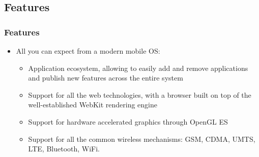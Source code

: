 \subsection{Features}
\begin{frame}
  \frametitle{Features}
  \begin{itemize}
  \item All you can expect from a modern mobile OS:
    \begin{itemize}
    \item Application ecosystem, allowing to easily add and remove
      applications and publish new features across the entire system
    \item Support for all the web technologies, with a browser built
      on top of the well-established WebKit rendering engine
    \item Support for hardware accelerated graphics through OpenGL ES
    \item Support for all the common wireless mechanisms: GSM, CDMA,
      UMTS, LTE, Bluetooth, WiFi.
    \end{itemize}
  \end{itemize}
\end{frame}

